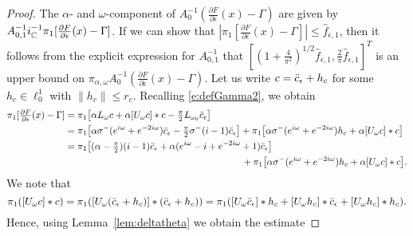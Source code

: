 \begin{proof}
	The $\alpha$- and $\omega$-component of  $A_0^{-1}  ( \tfrac{\partial F}{\partial  \epsilon} (x) -\Gamma )$ are given by $ A_{0,1}^{-1} i_{\mathbb{C}}^{-1} \pi_1 [  \tfrac{\partial F}{\partial  \epsilon} (x) -\Gamma ]$.
	If we can show that  $| \pi_1 [  \tfrac{\partial F}{\partial  \epsilon} (x) -\Gamma ]   |  \leq \hat{f}_{\epsilon,1}$, then it follows from the explicit expression for $A_{0,1}^{-1}$ that
	 $[ (1+\tfrac{4}{\pi^2})^{1/2}\hat{f}_{\epsilon,1} ,\tfrac{2}{\pi} \hat{f}_{\epsilon,1} ]^T$ 
	is an upper bound on 
	 $ \pi_{\alpha,\omega} A_0^{-1}  ( \tfrac{\partial F}{\partial  \epsilon} (x) -\Gamma )$.
	Let us write $ c = \bar{c}_{\epsilon} +h_c$ for some $ h_c \in \ell^1_0$ with $ \|h_c\| \leq r_c$.  Recalling  \eqref{e:defGamma2}, we obtain
	\begin{alignat*}{1}
	\pi_1[  \tfrac{\partial F}{\partial  \epsilon} (x) -\Gamma ] &=   \pi_1 \bigl[ \alpha L_\omega c + \alpha [ U_\omega c ] * c - \pp L_{\omega_0} \bce  \bigr]  \\
	&= \pi_1 \bigl[ \alpha \sigma^{-}( e^{i \omega} + e^{-2 i \omega} ) \bce- \pp \sigma^{-}(i-1) \bce \bigr] 
	+ \pi_1  \bigl[ \alpha \sigma^{-}( e^{i \omega} + e^{-2 i \omega} )h_c + \alpha [ U_\omega c] * c  \bigr] \\
	& = \pi_1 \bigl[ (\alpha - \pp) (i-1) \bce  + \alpha ( e^{i \omega} -i + e^{-2 i \omega} +1)\bce \bigr] 
	\\ & \hspace*{6.55cm}
	+ \pi_1  \bigl[ \alpha \sigma^{-}( e^{i \omega} + e^{-2 i \omega} )h_c + \alpha [ U_\omega c] * c  \bigr] .
	\end{alignat*}
We note that
\[
  \pi_1 ( [ U_\omega c] * c ) =  \pi_1 ([ U_\omega (\bar{c}_{\epsilon}+h_c)] * (\bar{c}_{\epsilon}+h_c) )
  =  \pi_1 ( [ U_\omega \bar{c}_{\epsilon}] * h_c + [ U_\omega h_c] * \bar{c}_{\epsilon} +
   [ U_\omega h_c] * h_c ).
 \]
Hence, using Lemma~\ref{lem:deltatheta} we obtain the estimate 

\end{proof}
